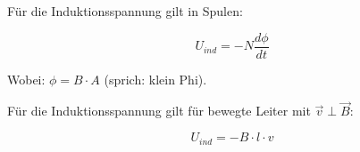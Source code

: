 Für die Induktionsspannung gilt in Spulen:

\begin{equation} \label{eq:InduGe}
	U_{ind} = -N \frac{d\phi}{dt}
\end{equation}

\noindent Wobei: $\phi = B \cdot A$ (sprich: \glqq klein Phi\grqq).

Für die Induktionsspannung gilt für bewegte Leiter mit $\vec{v} \perp \vec{B}$:

\begin{equation}
	U_{ind} = -B \cdot l \cdot v
\end{equation}